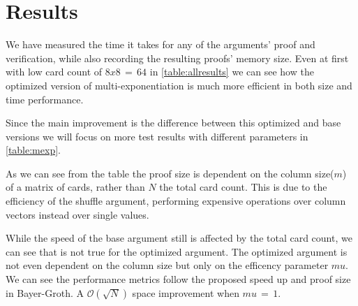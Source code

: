 \documentclass[12pt,a4paper]{report}
\begin{document}
\chapter{Results}
We have measured the time it takes for any of the arguments' proof and verification, while also recording the resulting proofs' memory size. 
Even at first with low card count of $8 x 8\,=\,64$ in \ref{table:allresults} we can see how the optimized version of multi-exponentiation is much more efficient in both size and time performance.\par
Since the main improvement is the difference between this optimized and base versions we will focus on more test results with different parameters in \ref{table:mexp}.\par
As we can see from the table the proof size is dependent on the column size($m$) of a matrix of cards, rather than $N$ the total card count.
This is due to the efficiency of the shuffle argument, performing expensive operations over column vectors instead over single values.\par
While the speed of the base argument still is affected by the total card count, we can see that is not true for the optimized argument. The optimized argument is not even dependent on the column size but only on the efficency parameter $mu$.
We can see the performance metrics follow the proposed speed up and proof size in Bayer-Groth. A $\mathcal{O}(\sqrt{N})$\cite{bgshuffle} space improvement when $mu\,=\,1$.
\end{document}
